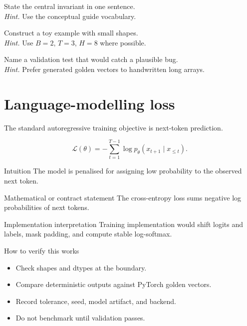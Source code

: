 \begin{chapterexercises}
\item State the central invariant in one sentence.\\
\textit{Hint.} Use the conceptual guide vocabulary.
\item Construct a toy example with small shapes.\\
\textit{Hint.} Use $B=2$, $T=3$, $H=8$ where possible.
\item Name a validation test that would catch a plausible bug.\\
\textit{Hint.} Prefer generated golden vectors to handwritten long arrays.
\end{chapterexercises}

\chapter{Language-modelling loss}
\label{ch:lm-loss}
The standard autoregressive training objective is next-token prediction.

\[
\mathcal{L}(\theta)=-\sum_{t=1}^{T-1}\log p_{\theta}(x_{t+1}\mid x_{\leq t}).
\]

\begin{intuitionbox}{Intuition}
The model is penalised for assigning low probability to the observed next token.
\end{intuitionbox}

\begin{definitionbox}{Mathematical or contract statement}
The cross-entropy loss sums negative log probabilities of next tokens.
\end{definitionbox}

\begin{implementationbox}{Implementation interpretation}
Training implementation would shift logits and labels, mask padding, and compute stable log-softmax.
\end{implementationbox}

\begin{verificationbox}{How to verify this works}
\begin{itemize}
\item Check shapes and dtypes at the boundary.
\item Compare deterministic outputs against PyTorch golden vectors.
\item Record tolerance, seed, model artifact, and backend.
\item Do not benchmark until validation passes.
\end{itemize}
\end{verificationbox}

